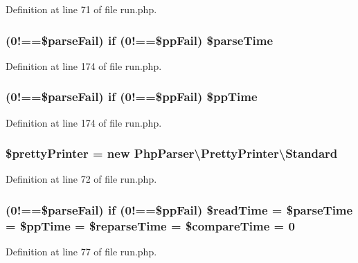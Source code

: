 Definition at line 71 of file run.\+php.

\subsubsection[{\$parse\+Time}]{ (0!==\$parse\+Fail) {\bf if} (0!==\$pp\+Fail) \$parse\+Time}\label{run_8php_a08dd4f324b7f0c6117372cab6fa5627d}


Definition at line 174 of file run.\+php.

\subsubsection[{\$pp\+Time}]{ (0!==\$parse\+Fail) {\bf if} (0!==\$pp\+Fail) \$pp\+Time}\label{run_8php_aae127ae91cba7ab85ac6883735d85822}


Definition at line 174 of file run.\+php.

\subsubsection[{\$pretty\+Printer}]{\setlength{\rightskip}{0pt plus 5cm}\$pretty\+Printer = new {\bf Php\+Parser\textbackslash{}\+Pretty\+Printer\textbackslash{}\+Standard}}\label{run_8php_ad60560760fcc21e1c22d8e484640b0b7}


Definition at line 72 of file run.\+php.

\subsubsection[{\$read\+Time}]{ (0!==\$parse\+Fail) {\bf if} (0!==\$pp\+Fail) \$read\+Time = \$parse\+Time = \$pp\+Time = \$reparse\+Time = \$compare\+Time = 0}\label{run_8php_acff0883153ae184501ab059650706752}


Definition at line 77 of file run.\+php.

